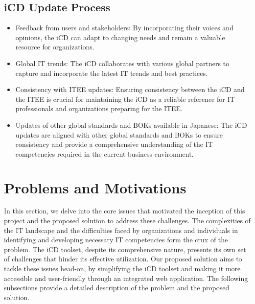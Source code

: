\subsection{iCD Update Process}

\begin{itemize}
    \item Feedback from users and stakeholders: By incorporating their voices and opinions, the iCD can adapt to changing needs and remain a valuable resource for organizations.
    \item Global IT trends: The iCD collaborates with various global partners to capture and incorporate the latest IT trends and best practices.
    \item Consistency with ITEE updates: Ensuring consistency between the iCD and the ITEE is crucial for maintaining the iCD as a reliable reference for IT professionals and organizations preparing for the ITEE.
    \item Updates of other global standards and BOKs available in Japanese: The iCD updates are aligned with other global standards and BOKs to ensure consistency and provide a comprehensive understanding of the IT competencies required in the current business environment.
\end{itemize}



\newpage
\section{Problems and Motivations}
In this section, we delve into the core issues that motivated the inception of this project and the proposed solution to address these challenges. The complexities of the IT landscape and the difficulties faced by organizations and individuals in identifying and developing necessary IT competencies form the crux of the problem. The iCD toolset, despite its comprehensive nature, presents its own set of challenges that hinder its effective utilization. Our proposed solution aims to tackle these issues head-on, by simplifying the iCD toolset and making it more accessible and user-friendly through an integrated web application. The following subsections provide a detailed description of the problem and the proposed solution.

